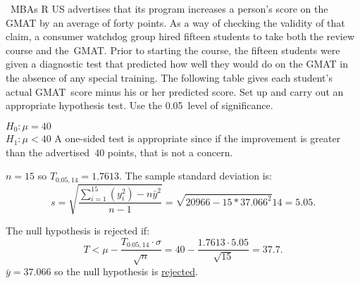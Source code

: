 \begin{problem}
  ~MBAs R US advertises that its program increases a person's score on the GMAT by an average of forty points.  As a way of checking the validity of that claim, a consumer watchdog group hired fifteen students to take both the review course and the~GMAT\@.  Prior to starting the course, the fifteen students were given a diagnostic test that predicted how well they would do on the GMAT in the absence of any special training.  The following table gives each student's actual GMAT~score minus his or her predicted score.  Set up and carry out an appropriate hypothesis test.  Use the 0.05~level of significance.
\end{problem}

$H_0: \mu = 40$\\
$H_1: \mu < 40$  A one-sided test is appropriate since if the improvement is greater than the advertised~40 points, that is not a concern.

${n = 15}$ so ${T_{0.05,14} = 1.7613}$.  The sample standard deviation is:
\begin{equation}
  s = \sqrt{\frac{\sum_{i=1}^{15} \left(y_{i}^2\right) - n \bar{y}^2}{n-1}} = \sqrt{20966 - 15 * 37.066^2}{14} = 5.05\text{.}
\end{equation}

The null hypothesis is rejected if:
\begin{equation}
  T < \mu - \frac{T_{0.05,14} \cdot \sigma}{\sqrt{n}} = 40 - \frac{1.7613 \cdot 5.05}{\sqrt{15}} = 37.7\text{.}
\end{equation}
${\bar{y} = 37.066}$ so the null hypothesis is \underline{rejected}.
